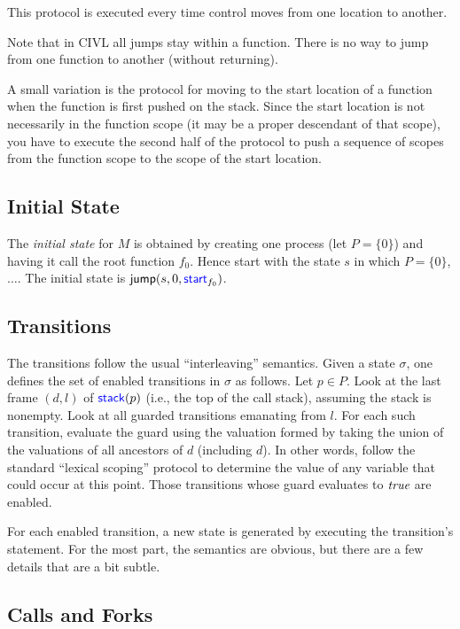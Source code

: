 \documentclass[11pt]{book}
\begin{document}
This protocol is executed every time control moves from one location
to another.

Note that in CIVL all jumps stay within a function.  There is no
way to jump from one function to another (without returning).

A small variation is the protocol for moving to the start location of
a function when the function is first pushed on the stack. Since the
start location is not necessarily in the function scope (it may be a
proper descendant of that scope), you have to execute the second half
of the protocol to push a sequence of scopes from the function scope
to the scope of the start location.

\subsection{Initial State}

The \emph{initial state} for $M$ is obtained by creating one process
(let $P=\{0\}$) and having it call the root function $f_0$. 
Hence start with the state $s$ in which $P=\{0\}$, $\ldots$.
The initial state is $\textsf{jump}(s,0,\textsf{\textcolor{blue}{\textup{start}}}_{f_0})$.

\subsection{Transitions}

The transitions follow the usual ``interleaving'' semantics. Given a
state $\sigma$, one defines the set of enabled transitions in $\sigma$
as follows. Let $p\in P$. Look at the last frame $(d,l)$ of
$\textsf{\textcolor{blue}{\textup{stack}}}(p)$ (i.e., the top of the call stack), assuming the stack is
nonempty. Look at all guarded transitions emanating from $l$. For each
such transition, evaluate the guard using the valuation formed by
taking the union of the valuations of all ancestors of $d$ (including
$d$). In other words, follow the standard ``lexical scoping'' protocol
to determine the value of any variable that could occur at this point.
Those transitions whose guard evaluates to $\emph{true}$ are enabled.

For each enabled transition, a new state is generated by executing
the transition's statement.  For the most part, the semantics are obvious,
but there are a few details that are a bit subtle.

\subsection{Calls and Forks}
\end{document}
